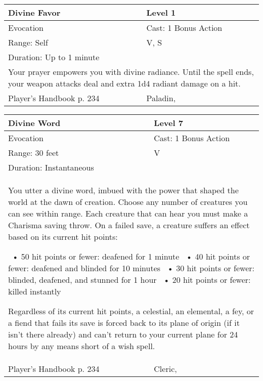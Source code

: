 \documentclass[11pt]{report}
\begin{document}
\begin{table}[H]
	\begin{tabular}{||p{6cm}|p{6cm}||}
		\hline\hline
		\bf{Divine Favor} & Level 1\\ \hline
		Evocation & Cast: 1 Bonus Action\\ \hline
		Range: Self & V, S\\ \hline
		Duration: Up to 1 minute & \\ \hline
		\multicolumn{2}{||p{12cm}||}{Your prayer empowers you with divine radiance. Until the spell ends, your weapon attacks deal and extra 1d4 radiant damage on a hit.}\\ \hline
Player's Handbook p. 234 & Paladin, \\ \hline\hline
	\end{tabular}
\end{table}

\begin{table}[H]
	\begin{tabular}{||p{6cm}|p{6cm}||}
		\hline\hline
		\bf{Divine Word} & Level 7\\ \hline
		Evocation & Cast: 1 Bonus Action\\ \hline
		Range: 30 feet & V\\ \hline
		Duration: Instantaneous & \\ \hline
		\multicolumn{2}{||p{12cm}||}{You utter a divine word, imbued with the power that shaped the world at the dawn of creation. 
Choose any number of creatures you can see within range. Each creature that can hear you must make a Charisma saving throw. On a failed save, a creature suffers an effect based on its current hit points: 

 •  50 hit points or fewer: deafened for 1 minute 
 •  40 hit points or fewer: deafened and blinded for 10 minutes 
 •  30 hit points or fewer: blinded, deafened, and stunned for 1 hour 
 •  20 hit points or fewer: killed instantly 

Regardless of its current hit points, a celestial, an elemental, a fey, or a fiend that fails its save is forced back to its plane of origin (if it isn’t there already) and can’t return to your current plane for 24 hours by any means short of a wish spell.}\\ \hline
Player's Handbook p. 234 & Cleric, \\ \hline\hline
	\end{tabular}
\end{table}
\end{document}
